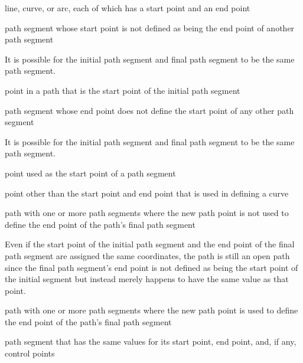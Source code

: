 %
line, \bezierlocal curve, or arc, each of which has a start point and an end point

%
path segment whose start point is not defined as being the end point of another path segment
\begin{note}
It is possible for the initial path segment and final path segment to be the same path segment.
\end{note}

%
point in a path that is the start point of the initial path segment

%
path segment whose end point does not define the start point of any other path segment
\begin{note}
It is possible for the initial path segment and final path segment to be the same path segment.
\end{note}

%
point used as the start point of a path segment

%
point other than the start point and end point that is used in defining a \bezierlocal curve

%
path with one or more path segments where the new path point is not used to define the end point of the path's final path segment
\begin{note}
Even if the start point of the initial path segment and the end point of the final path segment are assigned the same coordinates, the path is still an open path since the final path segment's end point is not defined as being the start point of the initial segment but instead merely happens to have the same value as that point.
\end{note}

%
path with one or more path segments where the new path point is used to define the end point of the path's final path segment

%
path segment that has the same values for its start point, end point, and, if any, control points

